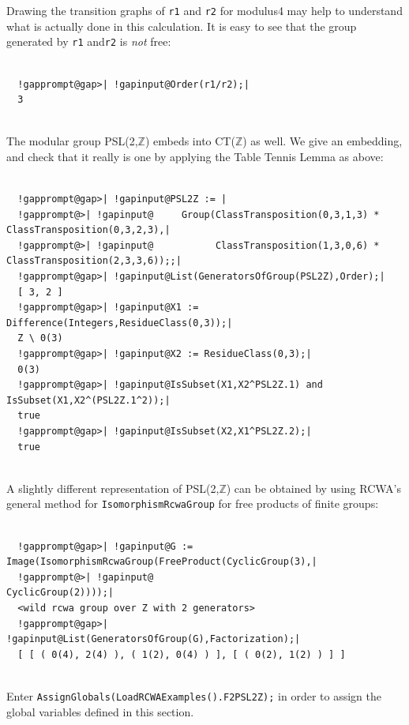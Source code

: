 \documentclass[a4paper,11pt]{report}
\begin{document}
{{\begin{Verbatim}[commandchars=!@|,fontsize=\small,frame=single,label=Example]
\end{Verbatim}
 Drawing the transition graphs of \texttt{r1} and \texttt{r2} for modulus{\nobreakspace}4 may help to understand what is actually done in
this calculation. It is easy to see that the group generated by \texttt{r1} and{\nobreakspace}\texttt{r2} is \emph{not} free: 
\begin{Verbatim}[commandchars=!@|,fontsize=\small,frame=single,label=Example]
  
  !gapprompt@gap>| !gapinput@Order(r1/r2);|
  3
  
\end{Verbatim}
 The modular group PSL(2,{\ensuremath{\mathbb Z}}) embeds into
CT({\ensuremath{\mathbb Z}}) as well. We give an embedding, and check that it
really is one by applying the Table Tennis Lemma as above: 
\begin{Verbatim}[commandchars=!@|,fontsize=\small,frame=single,label=Example]
  
  !gapprompt@gap>| !gapinput@PSL2Z := |
  !gapprompt@>| !gapinput@     Group(ClassTransposition(0,3,1,3) * ClassTransposition(0,3,2,3),|
  !gapprompt@>| !gapinput@           ClassTransposition(1,3,0,6) * ClassTransposition(2,3,3,6));;|
  !gapprompt@gap>| !gapinput@List(GeneratorsOfGroup(PSL2Z),Order);|
  [ 3, 2 ]
  !gapprompt@gap>| !gapinput@X1 := Difference(Integers,ResidueClass(0,3));|
  Z \ 0(3)
  !gapprompt@gap>| !gapinput@X2 := ResidueClass(0,3);|
  0(3)
  !gapprompt@gap>| !gapinput@IsSubset(X1,X2^PSL2Z.1) and IsSubset(X1,X2^(PSL2Z.1^2));|
  true
  !gapprompt@gap>| !gapinput@IsSubset(X2,X1^PSL2Z.2);|
  true
  
\end{Verbatim}
 A slightly different representation of PSL(2,{\ensuremath{\mathbb Z}}) can be
obtained by using \textsf{RCWA}'s general method for \texttt{IsomorphismRcwaGroup} for free products of finite groups: 
\begin{Verbatim}[commandchars=!@|,fontsize=\small,frame=single,label=Example]
  
  !gapprompt@gap>| !gapinput@G := Image(IsomorphismRcwaGroup(FreeProduct(CyclicGroup(3),|
  !gapprompt@>| !gapinput@                                               CyclicGroup(2))));|
  <wild rcwa group over Z with 2 generators>
  !gapprompt@gap>| !gapinput@List(GeneratorsOfGroup(G),Factorization);|
  [ [ ( 0(4), 2(4) ), ( 1(2), 0(4) ) ], [ ( 0(2), 1(2) ) ] ]
  
\end{Verbatim}
 Enter \texttt{AssignGlobals(LoadRCWAExamples().F2{\textunderscore}PSL2Z);} in order to assign the global variables defined in this section.  }

  }
\end{document}
